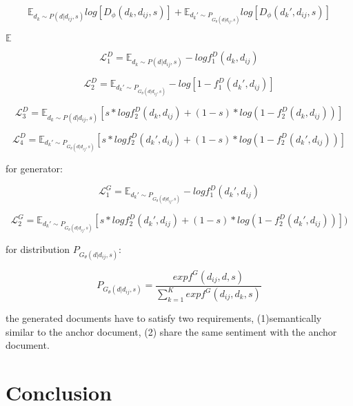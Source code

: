\documentclass[3p,review]{elsarticle}
\begin{document}
\begin{equation}\label{eq:gen}
\mathbb{E}_{d_k\sim P(d|d_{ij},s)}log[D_{\phi}(d_k,d_{ij},s)]+\mathbb{E}_{d_k'\sim P_{G_{\theta}(d|d_{ij},s)}}log[D_{\phi}(d_k',d_{ij},s)]
\end{equation}

$\mathbb{E}$

\begin{equation}\label{eq:d1}
  \mathcal{L}_1^D=\mathbb{E}_{d_k\sim P(d|d_{ij},s)}-logf_1^D(d_k,d_{ij})
\end{equation}

\begin{equation}\label{eq:d2}
  \mathcal{L}_2^D=\mathbb{E}_{d_k'\sim P_{G_{\theta}(d|d_{ij},s)}}-log[1-f_1^D(d_k',d_{ij})]
\end{equation}


\begin{equation}\label{eq:d1}
  \mathcal{L}_3^D=\mathbb{E}_{d_k\sim P(d|d_{ij},s)}[s*log f_2^D(d_k,d_{ij})+(1-s)*log(1-f_2^D(d_k,d_{ij}))]
\end{equation}


\begin{equation}\label{eq:d1}
  \mathcal{L}_4^D=\mathbb{E}_{d_k'\sim P_{G_{\theta}(d|d_{ij},s)}}[s*log f_2^D(d_k',d_{ij})+(1-s)*log(1-f_2^D(d_k',d_{ij}))]
\end{equation}


for generator:

\begin{equation}\label{eq:g1}
  \mathcal{L}_1^G=\mathbb{E}_{d_k'\sim P_{G_{\theta}(d|d_{ij},s)}}-logf_1^D(d_k',d_{ij})
\end{equation}

\begin{equation}\label{eq:g1}
  \mathcal{L}_2^G=\mathbb{E}_{d_k'\sim P_{G_{\theta}(d|d_{ij},s)}}[s*log f_2^D(d_k',d_{ij})+(1-s)*log(1-f_2^D(d_k',d_{ij}))] )
\end{equation}

for distribution $P_{G_{\theta}(d|d_{ij},s)}$:

\begin{equation}\label{eq:pg}
  P_{G_{\theta}(d|d_{ij},s)}=\frac{exp f^G(d_{ij},d,s)}{\sum_{k=1}^Kexp f^G(d_{ij}, d_k, s)}
\end{equation}


the generated documents have to satisfy two requirements, (1)semantically similar to the anchor document, (2) share the same sentiment with the anchor document.

\section{Conclusion}
\end{document}
